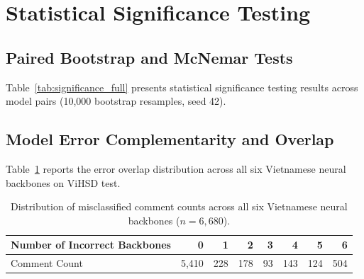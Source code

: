 \documentclass[runningheads]{llncs}
\begin{document}
\section{Statistical Significance Testing}
\clearpage
\subsection{Paired Bootstrap and McNemar Tests}
Table~\ref{tab:significance_full} presents statistical significance testing results across model pairs (10,000 bootstrap resamples, seed 42).

\begin{table}[H]
\centering
\caption{Paired statistical significance tests (paired bootstrap and exact McNemar test) on ViHSD test ($n=6{,}680$).}
\label{tab:significance_full}
\small
\setlength{\tabcolsep}{2pt}
\end{table}

\subsection{Model Error Complementarity and Overlap}
Table~\ref{tab:error_overlap} reports the error overlap distribution across all six Vietnamese neural backbones on ViHSD test.

\begin{table}[H]
\centering
\caption{Distribution of misclassified comment counts across all six Vietnamese neural backbones ($n=6{,}680$).}
\label{tab:error_overlap}
\begin{tabular}{lrrrrrrr}
\toprule
Number of Incorrect Backbones & 0 & 1 & 2 & 3 & 4 & 5 & 6 \\
\midrule
Comment Count & 5,410 & 228 & 178 & 93 & 143 & 124 & 504 \\
\bottomrule
\end{tabular}
\end{table}
\end{document}

